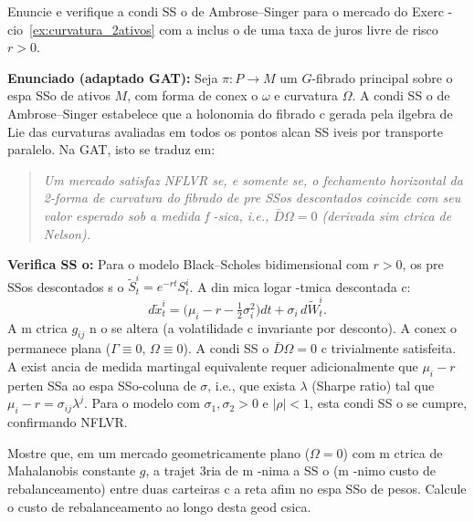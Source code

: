 \begin{exer}
\label{ex:ambrose_singer}
Enuncie e verifique a condi SS o de Ambrose--Singer para o mercado do Exerc -cio~\ref{ex:curvatura_2ativos} com a inclus o de uma taxa de juros livre de risco $r>0$.
\end{exer}

\begin{sol}
\textbf{Enunciado (adaptado GAT):} Seja $\pi:P\to M$ um $G$-fibrado principal sobre o espa SSo de ativos $M$, com forma de conex o $\omega$ e curvatura $\Omega$. A condi SS o de Ambrose--Singer estabelece que a holonomia do fibrado c gerada pela ilgebra de Lie das curvaturas avaliadas em todos os pontos alcan SS iveis por transporte paralelo. Na GAT, isto se traduz em:

\begin{quote}
\textit{Um mercado satisfaz NFLVR se, e somente se, o fechamento horizontal da 2-forma de curvatura do fibrado de pre SSos descontados coincide com seu valor esperado sob a medida f -sica, i.e., $\bar{D}\Omega = 0$ (derivada sim ctrica de Nelson).}
\end{quote}

\textbf{Verifica SS o:} Para o modelo Black--Scholes bidimensional com $r>0$, os pre SSos descontados s o $\tilde S^i_t = e^{-rt}S^i_t$. A din mica logar -tmica descontada c:
\begin{equation}
 d\tilde x^i_t = \bigl(\mu_i - r - \tfrac{1}{2}\sigma_i^2\bigr)dt + \sigma_i\,d\tilde W^i_t.
\end{equation}
A m ctrica $g_{ij}$ n o se altera (a volatilidade c invariante por desconto). A conex o permanece plana ($\Gamma\equiv 0$, $\Omega\equiv 0$). A condi SS o $\bar{D}\Omega = 0$ c trivialmente satisfeita. A exist ancia de medida martingal equivalente requer adicionalmente que $\mu_i - r$ perten SSa ao espa SSo-coluna de $\sigma$, i.e., que exista $\lambda$ (Sharpe ratio) tal que $\mu_i - r = \sigma_{ij}\lambda^j$. Para o modelo com $\sigma_1,\sigma_2>0$ e $|\rho|<1$, esta condi SS o se cumpre, confirmando NFLVR.
\end{sol}

\begin{exer}
\label{ex:geodesicas}
Mostre que, em um mercado geometricamente plano ($\Omega=0$) com m ctrica de Mahalanobis constante $g$, a trajet 3ria de m -nima a SS o (m -nimo custo de rebalanceamento) entre duas carteiras c a reta afim no espa SSo de pesos. Calcule o custo de rebalanceamento ao longo desta geod csica.
\end{exer}

